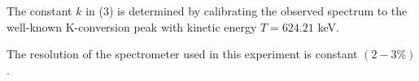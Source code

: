 \documentclass[12pt, a4paper]{article}
\begin{document}
\begin{multicols}{2}
The constant $k$ in (3) is determined by calibrating the observed spectrum to the well-known K-conversion peak with kinetic energy $T = 624.21$ keV.


The resolution of the spectrometer used in this experiment is constant $(2-3\%)$. 








\end{multicols}


\end{document}
